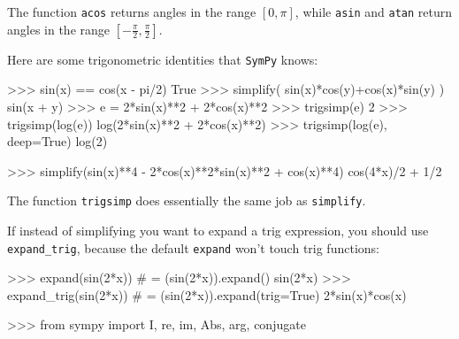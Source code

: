\noindent
The function \texttt{acos} returns angles in the range $[0,\pi]$,
while \texttt{asin} and \texttt{atan} return angles in the range $[-\frac{\pi}{2},\frac{\pi}{2}]$.


Here are some trigonometric identities that \texttt{SymPy} knows:

\small
\begin{verbatimtab}
>>> sin(x) == cos(x - pi/2)      
True
>>> simplify( sin(x)*cos(y)+cos(x)*sin(y) )
sin(x + y)
>>> e = 2*sin(x)**2 + 2*cos(x)**2
>>> trigsimp(e)
2
>>> trigsimp(log(e))
log(2*sin(x)**2 + 2*cos(x)**2)
>>> trigsimp(log(e), deep=True)
log(2)
\end{verbatimtab}
\normalsize

\small
\begin{verbatimtab}
>>> simplify(sin(x)**4 - 2*cos(x)**2*sin(x)**2 + cos(x)**4)
cos(4*x)/2 + 1/2
\end{verbatimtab}
\normalsize

\noindent
The function \texttt{trigsimp} does essentially the same job as \texttt{simplify}.

If instead of simplifying you want to expand a trig expression,
you should use \texttt{expand\_trig}, because the default \texttt{expand} won't touch trig functions:

\small
\begin{verbatimtab}
>>> expand(sin(2*x))        # = (sin(2*x)).expand()
sin(2*x)
>>> expand_trig(sin(2*x))   # = (sin(2*x)).expand(trig=True)
2*sin(x)*cos(x)
\end{verbatimtab}
\normalsize






\label{sec:sympytut_complex_numbers}

\small
\begin{verbatimtab}
>>> from sympy import I, re, im, Abs, arg, conjugate
\end{verbatimtab}
\normalsize


